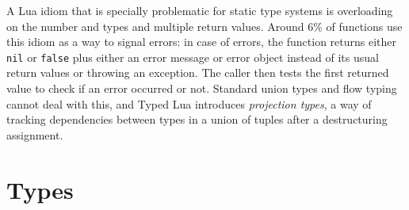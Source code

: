 \documentclass[preprint]{sigplanconf}
\begin{document}
A Lua idiom that is specially problematic for static type
systems is overloading on the number and types and
multiple return values. Around 6\% of functions use
this idiom as a way to signal errors: in case of errors,
the function returns either {\tt nil} or {\tt false} plus
either an error message or error object instead of its usual
return values or throwing an exception. The caller then
tests the first returned value to check if an error occurred
or not. Standard union types and flow typing cannot deal
with this, and Typed Lua introduces {\em projection types},
a way of tracking dependencies between types in a union of
tuples after a destructuring assignment.

\section{Types}
\label{sec:types}
\end{document}
